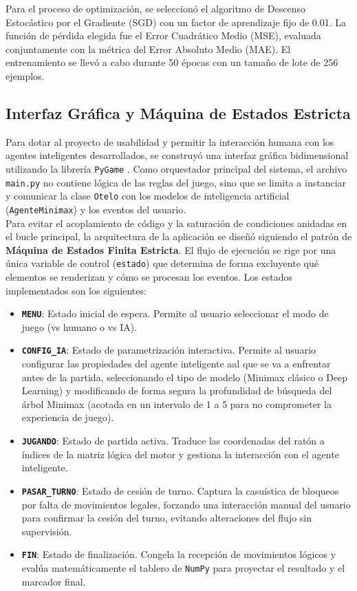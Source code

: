 \documentclass[conference]{IEEEtran}
\begin{document}
\vspace{0.25 cm}
Para el proceso de optimización, se seleccionó el algoritmo de Descenso Estocástico por el Gradiente (SGD) con un factor de aprendizaje fijo de 0.01. La función de pérdida elegida fue
el Error Cuadrático Medio (MSE), evaluada conjuntamente con la métrica del Error Absoluto Medio (MAE). El entrenamiento se llevó a cabo durante 50 épocas con un tamaño de lote de 256 ejemplos.

\subsection{\textbf{Interfaz Gráfica y Máquina de Estados Estricta}}
Para dotar al proyecto de usabilidad y permitir la interacción humana con los agentes inteligentes 
desarrollados, se construyó una interfaz gráfica bidimensional utilizando la librería \texttt{PyGame} \cite{pygame}. Como orquestador principal del sistema, el archivo \texttt{main.py} no contiene lógica de las reglas del juego, sino que se limita a instanciar y comunicar la clase \texttt{Otelo} con los modelos de inteligencia artificial (\texttt{AgenteMinimax}) y los eventos del usuario.\\

Para evitar el acoplamiento de código y la saturación de condiciones anidadas en el bucle principal, la arquitectura de la aplicación se diseñó siguiendo 
el patrón de \textbf{Máquina de Estados Finita Estricta}. El flujo de ejecución se rige por una única variable de control (\texttt{estado}) que determina de forma excluyente qué elementos 
se renderizan y cómo se procesan los eventos. Los estados implementados son los siguientes:\\

\begin{itemize}
    \item \textbf{\texttt{MENU}}: Estado inicial de espera. Permite al usuario seleccionar el modo de juego (vs humano o vs IA).
    \item \textbf{\texttt{CONFIG\_IA}}: Estado de parametrización interactiva. Permite al usuario configurar las 
    propiedades del agente inteligente aal que se va a enfrentar antes de la partida, seleccionando el tipo de modelo (Minimax clásico o Deep Learning) y modificando de forma segura la profundidad de búsqueda del árbol Minimax (acotada 
    en un intervalo de 1 a 5 para no comprometer la experiencia de juego).
    \item \textbf{\texttt{JUGANDO}}: Estado de partida activa. Traduce las coordenadas del ratón a índices de la matriz lógica del motor 
    y gestiona la interacción con el agente inteligente.
    \item \textbf{\texttt{PASAR\_TURNO}}: Estado de cesión de turno. Captura la casuística de bloqueos por falta de movimientos 
    legales, forzando una interacción manual del usuario para confirmar la cesión del turno, evitando alteraciones del flujo sin supervisión.
    \item \textbf{\texttt{FIN}}: Estado de finalización. Congela la recepción de movimientos lógicos y evalúa matemáticamente 
    el tablero de \texttt{NumPy} para proyectar el resultado y el marcador final.
\end{itemize}
\end{document}
